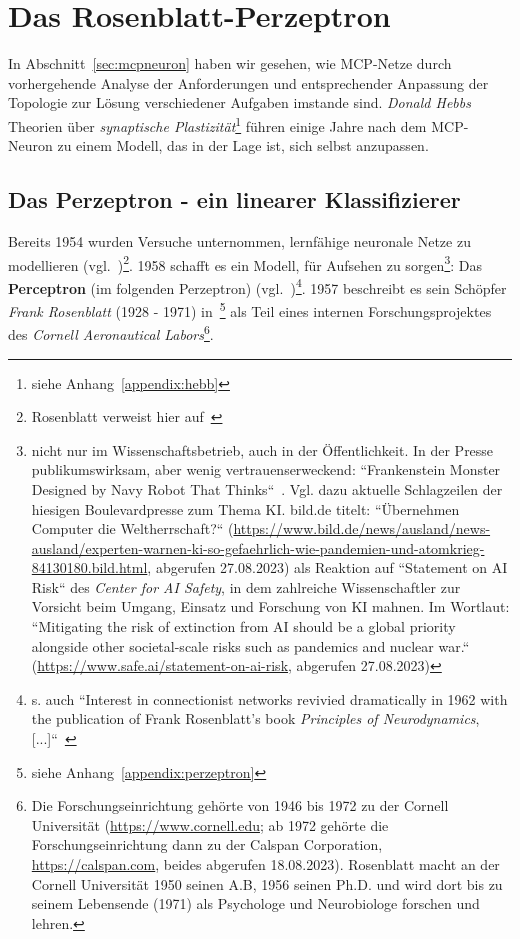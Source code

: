 \section{Das Rosenblatt-Perzeptron}\label{sec:rosenblattperceptron}

In Abschnitt~\ref{sec:mcpneuron} haben wir gesehen, wie MCP-Netze durch vorhergehende Analyse der Anforderungen und entsprechender Anpassung der Topologie zur Lösung verschiedener Aufgaben imstande sind.
\textit{Donald Hebbs} Theorien über \textit{synaptische Plastizität}\footnote{
    siehe Anhang~\ref{appendix:hebb}
} führen einige Jahre nach dem MCP-Neuron zu einem Modell, das in der Lage ist, sich selbst anzupassen.


\subsection{Das Perzeptron - ein linearer Klassifizierer}

Bereits 1954 wurden Versuche unternommen, lernfähige neuronale Netze zu modellieren (vgl.~\cite[24]{Ros62})\footnote{
    Rosenblatt verweist hier auf~\cite{FC54}
}.
1958 schafft es ein Modell, für Aufsehen zu sorgen\footnote{
    nicht nur im Wissenschaftsbetrieb, auch in der Öffentlichkeit. In der Presse publikumswirksam, aber wenig vertrauenserweckend: ``Frankenstein Monster Designed by Navy Robot That Thinks``~\cite[v]{Ros62}. Vgl. dazu aktuelle Schlagzeilen der hiesigen Boulevardpresse zum Thema KI. bild.de titelt: ``Übernehmen Computer die Weltherrschaft{?}`` (\url{https://www.bild.de/news/ausland/news-ausland/experten-warnen-ki-so-gefaehrlich-wie-pandemien-und-atomkrieg-84130180.bild.html}, abgerufen 27.08.2023) als Reaktion auf ``Statement on AI Risk`` des \textit{Center for AI Safety}, in dem zahlreiche Wissenschaftler zur Vorsicht beim Umgang, Einsatz und Forschung von KI mahnen. Im Wortlaut: ``Mitigating the risk of extinction from AI should be a global priority alongside other societal-scale risks such as pandemics and nuclear war.`` (\url{https://www.safe.ai/statement-on-ai-risk}, abgerufen 27.08.2023)
}: Das \textbf{Perceptron} (im folgenden Perzeptron) (vgl.~\cite[89]{AR88})\footnote{
    s. auch ``Interest in connectionist networks revivied dramatically in 1962 with the publication of Frank Rosenblatt's book \textit{Principles of Neurodynamics}, [...]``~\cite[xi; Hervorhebung i.O.]{MP88}
}.
1957 beschreibt es sein Schöpfer \textit{Frank Rosenblatt} (1928 - 1971) in~\cite{Ros57}\footnote{
    siehe Anhang~\ref{appendix:perzeptron}
} als Teil eines internen Forschungsprojektes des \textit{Cornell Aeronautical Labors}\footnote{
    Die Forschungseinrichtung gehörte von 1946 bis 1972 zu der Cornell Universität (\url{https://www.cornell.edu}; ab 1972 gehörte die Forschungseinrichtung dann zu der Calspan Corporation, \url{https://calspan.com}, beides abgerufen 18.08.2023). Rosenblatt macht an der Cornell Universität 1950 seinen A.B, 1956 seinen Ph.D. und wird dort bis zu seinem Lebensende (1971) als Psychologe und Neurobiologe forschen und lehren.
}.

